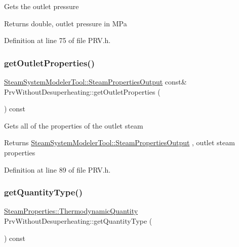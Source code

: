 Gets the outlet pressure

\begin{DoxyReturn}{Returns}
double, outlet pressure in M\+Pa 
\end{DoxyReturn}


Definition at line 75 of file P\+R\+V.\+h.

\mbox{\label{class_prv_without_desuperheating_afcf1f5d7e6b18643ac8adc9023578147}} 
\subsubsection{\texorpdfstring{get\+Outlet\+Properties()}{getOutletProperties()}}
{\footnotesize\ttfamily \hyperlink{struct_steam_system_modeler_tool_1_1_steam_properties_output}{Steam\+System\+Modeler\+Tool\+::\+Steam\+Properties\+Output} const\& Prv\+Without\+Desuperheating\+::get\+Outlet\+Properties (\begin{DoxyParamCaption}{ }\end{DoxyParamCaption}) const\hspace{0.3cm}{\ttfamily [inline]}}

Gets all of the properties of the outlet steam \begin{DoxyReturn}{Returns}
\hyperlink{struct_steam_system_modeler_tool_1_1_steam_properties_output}{Steam\+System\+Modeler\+Tool\+::\+Steam\+Properties\+Output} , outlet steam properties 
\end{DoxyReturn}


Definition at line 89 of file P\+R\+V.\+h.

\mbox{\label{class_prv_without_desuperheating_ad465c855f0c7271110ed2cb2ebccf081}} 
\subsubsection{\texorpdfstring{get\+Quantity\+Type()}{getQuantityType()}}
{\footnotesize\ttfamily \hyperlink{class_steam_properties_ae0294bedf7d178c2d8fb6aed0f62fbff}{Steam\+Properties\+::\+Thermodynamic\+Quantity} Prv\+Without\+Desuperheating\+::get\+Quantity\+Type (\begin{DoxyParamCaption}{ }\end{DoxyParamCaption}) const\hspace{0.3cm}{\ttfamily [inline]}}

